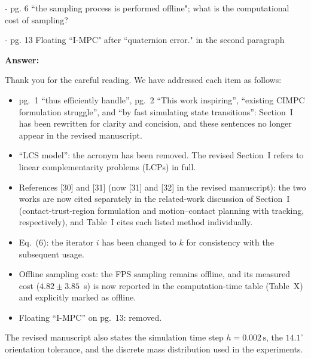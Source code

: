 \documentclass[journal,10pt]{IEEEtran}
\newcommand{\answer}{\par\smallskip\noindent\color{black}\textbf{Answer: }\ignorespaces
}
\begin{document}
- pg. 6 ``the sampling process is performed offline"; what is the
computational cost of sampling?

- pg. 13 Floating ``I-MPC" after ``quaternion error." in the second
paragraph

\answer 
Thank you for the careful reading. We have addressed each item as follows:
\begin{itemize}
 \item pg.~1 ``thus efficiently handle'', pg.~2 ``This work inspiring'', ``existing CIMPC formulation struggle'', and ``by fast simulating state transitions'': Section~I has been rewritten for clarity and concision, and these sentences no longer appear in the revised manuscript.
 \item ``LCS model'': the acronym has been removed. The revised Section~I refers to linear complementarity problems (LCPs) in full.
 \item References [30] and [31] (now [31] and [32] in the revised manuscript): the two works are now cited separately in the related-work discussion of Section~I (contact-trust-region formulation and motion--contact planning with tracking, respectively), and Table~I cites each listed method individually.
 \item Eq.~(6): the iterator $i$ has been changed to $k$ for consistency with the subsequent usage.
 \item Offline sampling cost: the FPS sampling remains offline, and its measured cost ($4.82\pm3.85$~s) is now reported in the computation-time table (Table~X) and explicitly marked as offline.
 \item Floating ``I-MPC'' on pg.~13: removed.
\end{itemize}
The revised manuscript also states the simulation time step $h=0.002\,\mathrm{s}$, the $14.1^\circ$ orientation tolerance, and the discrete mass distribution used in the experiments.
\end{document}
